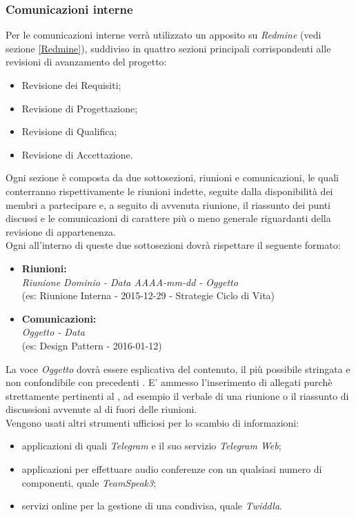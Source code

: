 \documentclass{scalatekids-article}
\begin{document}
\subsubsection{Comunicazioni interne}
\label{sec:Comunicazioni interne}
Per le comunicazioni interne verrà utilizzato un  apposito su
\textit{Redmine} (vedi sezione \ref{Redmine}), suddiviso in quattro sezioni
principali corrispondenti alle revisioni di avanzamento del progetto:
\begin{itemize}
\item Revisione dei Requisiti;
\item Revisione di Progettazione;
\item Revisione di Qualifica;
\item Revisione di Accettazione.
\end{itemize}
Ogni sezione è composta da due sottosezioni, riunioni e comunicazioni, le quali
conterranno rispettivamente le riunioni indette, seguite dalla disponibilità dei
membri a partecipare e, a seguito di avvenuta riunione, il riassunto dei punti
discussi e le comunicazioni di carattere più o meno generale riguardanti
 della revisione di appartenenza.\\ Ogni  all'interno di
queste due sottosezioni dovrà rispettare il seguente formato:
\begin{itemize}
\item\textbf{Riunioni:}\\
  \textit{Riunione Dominio - Data AAAA-mm-dd - Oggetto}\\
  (es: Riunione Interna - 2015-12-29 - Strategie Ciclo di Vita)
\item\textbf{Comunicazioni:}\\
  \textit{Oggetto - Data}\\
  (es: Design Pattern - 2016-01-12)
\end{itemize}
La voce \textit{Oggetto} dovrà essere esplicativa del contenuto, il più
possibile stringata e non confondibile con precedenti . E' ammesso
l'inserimento di allegati purchè strettamente pertinenti al , ad
esempio il verbale di una riunione o il riassunto di discussioni avvenute al di
fuori delle riunioni.\\ Vengono usati altri strumenti ufficiosi per lo scambio
di informazioni:
\begin{itemize}
\item applicazioni di  quali \textit{Telegram} e il suo servizio \textit{Telegram Web};
\item applicazioni  per effettuare audio conferenze con un qualsiasi numero di componenti, quale \textit{TeamSpeak3};
\item servizi online per la gestione di una  condivisa, quale \textit{Twiddla}.
\end{itemize}
\end{document}
